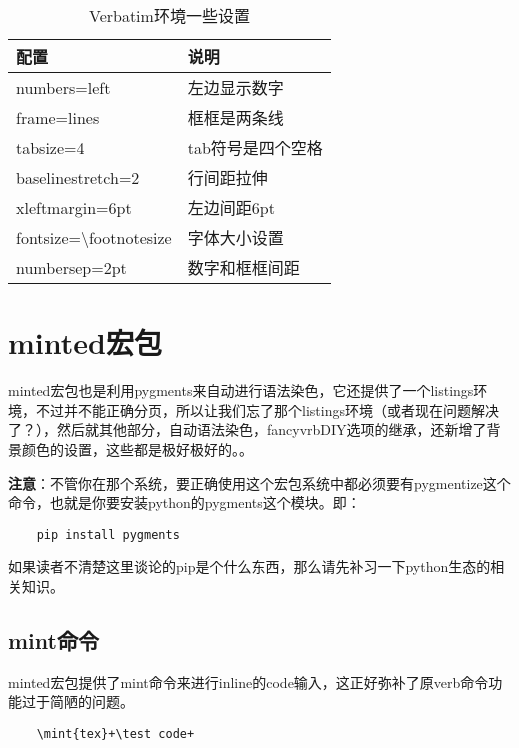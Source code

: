 \documentclass[11pt,oneside]{book}
\begin{document}
  \begin{table}[H]
    \centering
    \caption{Verbatim环境一些设置}
    \label{tab:Verbatim环境一些设置}
    \medskip
    \begin{tabular}{@{}ll@{}}
      \toprule
      配置                        & 说明     \\ \midrule
      numbers=left                         & 左边显示数字     \\
      frame=lines                          & 框框是两条线     \\
      tabsize=4                            & tab符号是四个空格 \\
      baselinestretch=2                    & 行间距拉伸      \\
      xleftmargin=6pt                      & 左边间距6pt    \\
      fontsize=\textbackslash footnotesize & 字体大小设置     \\
      numbersep=2pt                        & 数字和框框间距 \\   \bottomrule
    \end{tabular}
  \end{table}



  \section{minted宏包}
  minted宏包也是利用pygments来自动进行语法染色，它还提供了一个listings环境，不过并不能正确分页，所以让我们忘了那个listings环境（或者现在问题解决了？），然后就其他部分，自动语法染色，fancyvrbDIY选项的继承，还新增了背景颜色的设置，这些都是极好极好的。。

  \textbf{注意}：不管你在那个系统，要正确使用这个宏包系统中都必须要有pygmentize这个命令，也就是你要安装python的pygments这个模块。即：

  \begin{Verbatim}
    pip install pygments
  \end{Verbatim}

  如果读者不清楚这里谈论的pip是个什么东西，那么请先补习一下python生态的相关知识。

  \subsection{mint命令}
  minted宏包提供了mint命令来进行inline的code输入，这正好弥补了原verb命令功能过于简陋的问题。

  \begin{Verbatim}
    \mint{tex}+\test code+
  \end{Verbatim}
\end{document}
